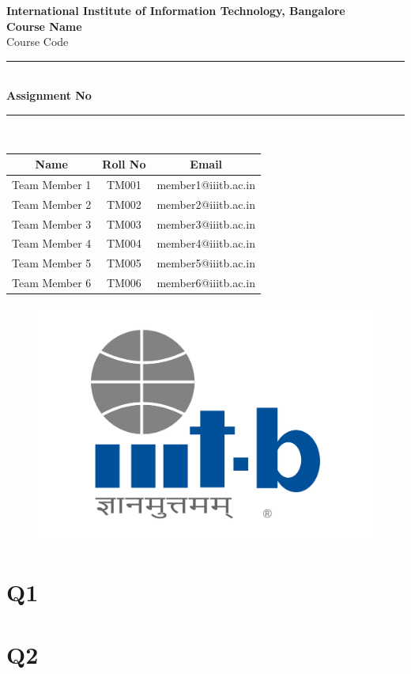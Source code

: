 \documentclass[a4paper,12pt]{article}
\begin{document}
\begin{center}
    \LARGE \textbf{International Institute of Information Technology, Bangalore}\\
    \vspace{1cm}
    {\LARGE \textbf{Course Name}}\\
    \large{Course Code}\\
    \vspace{2cm}
    \rule{\linewidth}{0.5mm} \\[10pt]
    {\Huge \textbf{Assignment No}}\\[10pt]
    \vspace{-10pt}
    \rule{\linewidth}{0.5mm} \\[10pt]
\end{center}

\vspace{1.5cm}

\begin{center}
    \vspace{10pt}
    
    \renewcommand{\arraystretch}{1.2}
    \begin{tabular}{|c|c|c|}
        \hline
        \textbf{Name} & \textbf{Roll No} & \textbf{Email} \\
        \hline
        Team Member 1 & TM001 & member1@iiitb.ac.in \\
        Team Member 2 & TM002 & member2@iiitb.ac.in \\
        Team Member 3 & TM003 & member3@iiitb.ac.in \\
        Team Member 4 & TM004 & member4@iiitb.ac.in \\
        Team Member 5 & TM005 & member5@iiitb.ac.in \\
        Team Member 6 & TM006 & member6@iiitb.ac.in \\
        \hline
    \end{tabular}
\end{center}


\vfill
\begin{figure}  
    \centering
    \includegraphics[width=0.5\linewidth]{assets/iiitb_logo.png}
\end{figure}

\newpage



\section*{Q1}
\lipsum[5-8]

\section*{Q2}
\lipsum[5-8]
\end{document}
